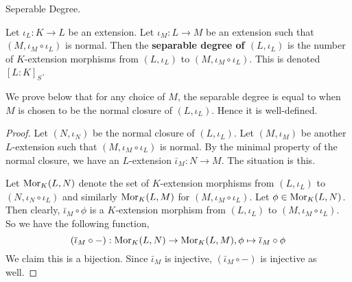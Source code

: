 \documentclass[../book.tex]{subfiles}
\begin{document}
\begin{dfn} Seperable Degree. 
    
    Let $\iota_L : K \to L$ be an extension. 
    Let $\iota_M : L \to M$ be an extension such that 
    $(M,\iota_M\circ\iota_L)$ is normal. 
    Then the \textbf{separable degree of $(L,\iota_L)$} is
    the number of $K$-extension morphisms 
    from $(L,\iota_L)$ to $(M,\iota_M\circ\iota_L)$.
    This is denoted $[L : K]_S$. 
    
    We prove below that for any choice of $M$,
    the separable degree is equal to when $M$ is chosen to be 
    the normal closure of $(L,\iota_L)$.
    Hence it is well-defined.
\end{dfn}
\begin{proof}
    Let $(N,\iota_N)$ be the normal closure of $(L,\iota_L)$.
    Let $(M,\iota_M)$ be another $L$-extension such that 
    $(M,\iota_M\circ\iota_L)$ is normal. 
    By the minimal property of the normal closure, 
    we have an $L$-extension $\bar\iota_M : N \to M$. 
    The situation is this. 
    \begin{figure} [H]
        \centering
    \end{figure}
    Let $\text{Mor}_{K}(L, N)$ denote the set of $K$-extension morphisms
    from $(L,\iota_L)$ to $(N,\iota_N\circ\iota_L)$
    and similarly $\text{Mor}_{K}(L, M)$ for $(M,\iota_M\circ\iota_L)$. 
    Let $\phi \in \text{Mor}_{K}(L, N)$. Then clearly, 
    $\bar\iota_M \circ \phi$ is a $K$-extension morphism 
    from $(L,\iota_L)$ to $(M,\iota_M\circ\iota_L)$. 
    So we have the following function, \[
        (\overline{\iota}_M \circ - ) : \text{Mor}_{K}(L, N) \to \text{Mor}_{K}(L, M), 
        \phi \mapsto \overline{\iota}_M \circ \phi
    \]
    We claim this is a bijection. 
    Since $\bar\iota_M$ is injective, $(\bar\iota_M \circ -)$ is injective as well.
    

\end{proof}
\end{document}
